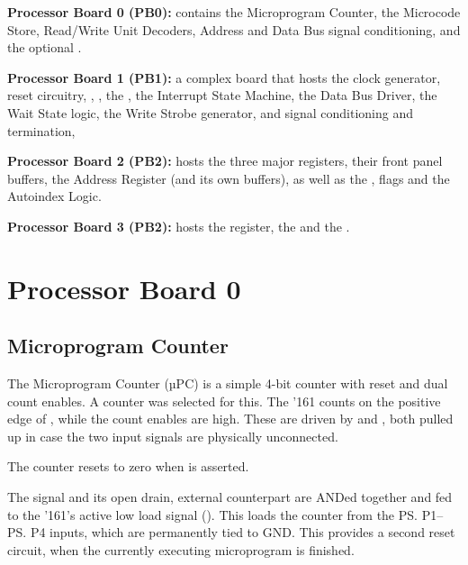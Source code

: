 \begin{description}

\item{\bfseries Processor Board 0 (PB0):} contains the Microprogram
  Counter, the Microcode Store, Read/Write Unit Decoders, Address and
  Data Bus signal conditioning, and the optional .

\item{\bfseries Processor Board 1 (PB1):} a complex board that hosts
  the clock generator, reset circuitry, , , the
  \IR{}, the Interrupt State Machine, the Data Bus Driver, the Wait
  State logic, the Write Strobe generator, and \IBUS{} signal
  conditioning and termination,

\item{\bfseries Processor Board 2 (PB2):} hosts the three major
  registers, their front panel buffers, the Address Register (and its
  own buffers), as well as the \Zreg, \Nreg{} flags and the Autoindex
  Logic.

\item{\bfseries Processor Board 3 (PB2):} hosts the \Lreg register,
  the \ALU{} and the \MBU.

\end{description}

\section{Processor Board 0}
\subsection{Microprogram Counter}
\label{sec:upc}

The Microprogram Counter (µPC) is a simple 4-bit counter with reset and dual
count enables. A  counter was selected for this. The '161 counts on the
positive edge of , while the count enables are high. These are driven
by  and , both pulled up in case the two input signals are
physically unconnected.

The counter resets to zero when  is asserted.

The  signal and its open drain, external counterpart  are
ANDed together and fed to the '161's active low load signal (). This
loads the counter from the \ps{P1}–\ps{P4} inputs, which are permanently tied
to GND. This provides a second reset circuit, when the currently executing
microprogram is finished.

